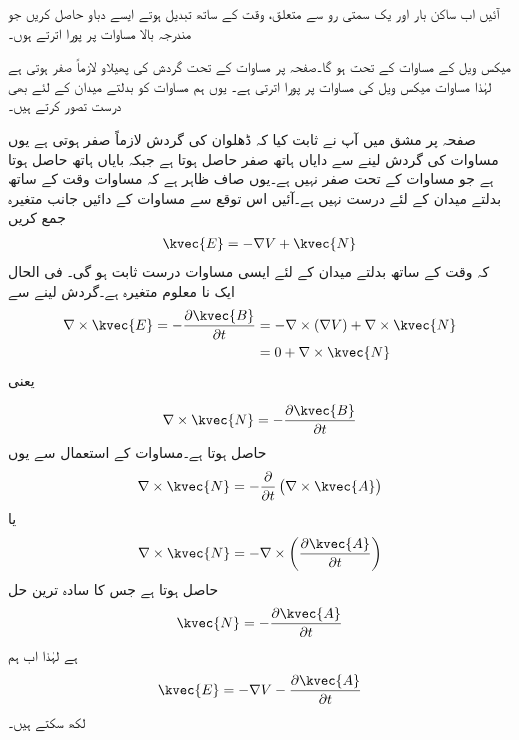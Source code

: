 آئیں اب ساکن بار اور یک سمتی رو سے متعلق، وقت کے ساتھ تبدیل ہوتے ایسے دباو حاصل کریں جو مندرجہ بالا مساوات پر پورا اترتے ہوں۔

میکس ویل کے مساوات کے تحت  ہو گا۔صفحہ  پر مساوات  کے تحت گردش کی پھیلاو لازماً صفر ہوتی ہے لہٰذا مساوات  میکس ویل کی مساوات  پر پورا اترتی ہے۔ یوں ہم مساوات  کو بدلتے میدان کے لئے بھی درست تصور کرتے ہیں۔


صفحہ  پر مشق  میں آپ نے ثابت کیا کہ ڈھلوان کی گردش لازماً صفر ہوتی ہے یوں مساوات  کی گردش لینے سے دایاں ہاتھ صفر حاصل ہوتا ہے جبکہ بایاں ہاتھ  حاصل ہوتا ہے جو مساوات  کے تحت صفر نہیں ہے۔یوں صاف ظاہر ہے کہ مساوات  وقت کے ساتھ بدلتے میدان کے لئے درست نہیں ہے۔آئیں اس توقع سے مساوات  کے دائیں جانب متغیرہ  جمع کریں
\begin{align*}
\kvec{E}=-\nabla V +\kvec{N}
\end{align*}
 کہ وقت کے ساتھ بدلتے میدان کے لئے ایسی مساوات درست ثابت ہو گی۔ فی الحال  ایک نا معلوم متغیرہ ہے۔گردش لینے سے
\begin{align*}
\nabla \times \kvec{E}=-\frac{\partial \kvec{B}}{\partial t} &=-\nabla \times \left( \nabla V\right) +\nabla \times \kvec{N}\\
&=0+\nabla \times \kvec{N}
\end{align*}
یعنی

\begin{align*}
\nabla \times \kvec{N}=-\frac{\partial \kvec{B}}{\partial t}
\end{align*}
حاصل ہوتا ہے۔مساوات  کے استعمال سے یوں
\begin{align*}
\nabla \times \kvec{N}=-\frac{\partial }{\partial t} \left(\nabla \times \kvec{A} \right)
\end{align*}
یا
\begin{align*}
\nabla \times \kvec{N}=-\nabla \times \left(\frac{\partial \kvec{A}}{\partial t} \right)
\end{align*}
حاصل ہوتا ہے جس کا سادہ ترین حل
\begin{align*}
\kvec{N}=-\frac{\partial \kvec{A}}{\partial t}
\end{align*}
ہے لہٰذا اب ہم
\begin{align}\label{مساوات_میکس-ویل_بدلتا_میدان_مساوات_ٹ}
\kvec{E}=-\nabla V -\frac{\partial \kvec{A}}{\partial t}
\end{align}
 لکھ سکتے ہیں۔

